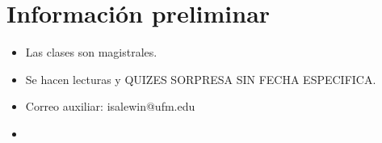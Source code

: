\section{Información preliminar}
\begin{itemize}
    \item Las clases son magistrales.
    \item Se hacen lecturas y QUIZES SORPRESA SIN FECHA ESPECIFICA.
    \item Correo auxiliar: isalewin@ufm.edu 
    \item 
\end{itemize}
